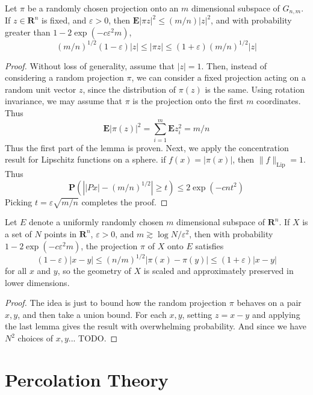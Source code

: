 \begin{lemma}
    Let $\pi$ be a randomly chosen projection onto an $m$ dimensional subspace of $G_{n,m}$. If $z \in \mathbf{R}^n$ is fixed, and $\varepsilon > 0$, then $\mathbf{E} |\pi z|^2 \leq (m/n) |z|^2$, and with probability greater than $1 - 2\exp(-c\varepsilon^2m)$,
    \[ (m/n)^{1/2} (1 - \varepsilon) |z| \leq |\pi z| \leq (1 + \varepsilon) (m/n)^{1/2} |z| \]
\end{lemma}
\begin{proof}
    Without loss of generality, assume that $|z| = 1$. Then, instead of considering a random projection $\pi$, we can consider a fixed projection acting on a random unit vector $z$, since the distribution of $\pi(z)$ is the same. Using rotation invariance, we may assume that $\pi$ is the projection onto the first $m$ coordinates. Thus
    \[ \mathbf{E}|\pi(z)|^2 = \sum_{i = 1}^m \mathbf{E} z_i^2 = m/n \]
    Thus the first part of the lemma is proven. Next, we apply the concentration result for Lipschitz functions on a sphere. if $f(x) = |\pi(x)|$, then $\| f \|_{\text{Lip}} = 1$. Thus
    \[ \mathbf{P}\left(\left| |Px| - (m/n)^{1/2} \right| \geq t \right) \leq 2 \exp(-cnt^2) \]
    Picking $t = \varepsilon \sqrt{m/n}$ completes the proof.
\end{proof}

\begin{theorem}
    Let $E$ denote a uniformly randomly chosen $m$ dimensional subspace of $\mathbf{R}^n$. If $X$ is a set of $N$ points in $\mathbf{R}^n$, $\varepsilon > 0$, and $m \gtrsim \log N / \varepsilon^2$, then with probability $1 - 2 \exp(-c\varepsilon^2 m)$, the projection $\pi$ of $X$ onto $E$ satisfies
    \[ (1 - \varepsilon)|x-y| \leq (n/m)^{1/2} | \pi(x) - \pi(y) | \leq (1 + \varepsilon) |x - y| \]
    for all $x$ and $y$, so the geometry of $X$ is scaled and approximately preserved in lower dimensions.
\end{theorem}
\begin{proof}
    The idea is just to bound how the random projection $\pi$ behaves on a pair $x,y$, and then take a union bound. For each $x,y$, setting $z = x - y$ and applying the last lemma gives the result with overwhelming probability. And since we have $N^2$ choices of $x,y$... TODO.
\end{proof}



\chapter{Percolation Theory}

